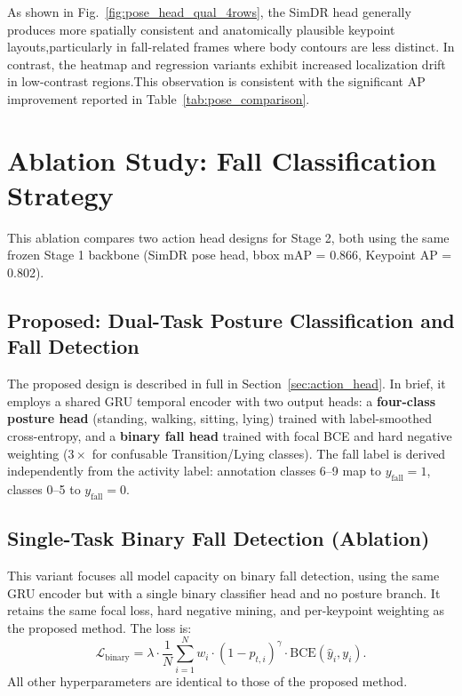 As shown in Fig.~\ref{fig:pose_head_qual_4rows}, the SimDR head generally produces more spatially consistent and anatomically plausible keypoint layouts,particularly in fall-related frames where body contours are less distinct. In contrast, the heatmap and regression variants exhibit increased localization
drift in low-contrast regions.This observation is consistent with the significant AP improvement reported in
Table~\ref{tab:pose_comparison}.

\section{Ablation Study: Fall Classification Strategy}
\label{sec:ablation_fall}

This ablation compares two action head designs for Stage 2, both using the same frozen Stage 1 backbone (SimDR pose head, bbox mAP = 0.866, Keypoint AP = 0.802).

\subsection{Proposed: Dual-Task Posture Classification and Fall Detection}
\label{sec:dualtask}

The proposed design is described in full in Section~\ref{sec:action_head}. In brief, it employs a shared GRU temporal encoder with two output heads: a \textbf{four-class posture head} (standing, walking, sitting, lying) trained with label-smoothed cross-entropy, and a \textbf{binary fall head} trained with focal BCE and hard negative weighting ($3\times$ for confusable Transition/Lying classes). The fall label is derived independently from the activity label: annotation classes 6--9 map to $y_\text{fall}=1$, classes 0--5 to $y_\text{fall}=0$.

\subsection{Single-Task Binary Fall Detection (Ablation)}
\label{sec:singletask}

This variant focuses all model capacity on binary fall detection, using the same GRU encoder but with a single binary classifier head and no posture branch. It retains the same focal loss, hard negative mining, and per-keypoint weighting as the proposed method. The loss is:
\begin{equation}
\mathcal{L}_{\text{binary}} = \lambda \cdot \frac{1}{N} \sum_{i=1}^{N} w_i \cdot (1 - p_{t,i})^{\gamma} \cdot \text{BCE}(\hat{y}_i, y_i).
\label{eq:binary_loss}
\end{equation}
All other hyperparameters are identical to those of the proposed method.


